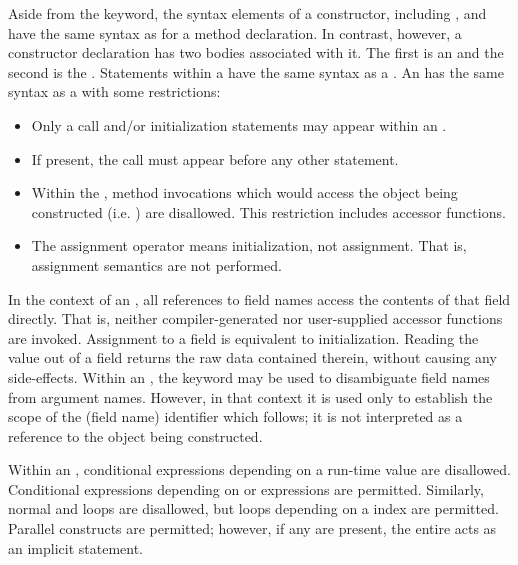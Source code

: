 Aside from the  keyword, the syntax elements of a constructor,
including ,  and 
have the same syntax as for a method declaration.  In contrast, however,
a constructor declaration has two bodies associated with it.  The first is
an  and the second is the .
Statements within a  have the same syntax as
a . An  has the same syntax as
a  with some restrictions:
\begin{itemize}
\item Only a  call and/or initialization statements
may appear within an .
\item If present, the  call must appear before any other statement.
\item Within the , method invocations which would
access the object being constructed (i.e. ) are disallowed.  This
restriction includes accessor functions.  
\item The assignment operator \chpl{=} means initialization, not assignment.
That is, assignment semantics are not performed.
\end{itemize}
\noindent
In the context of an
, all references to field names access the contents
of that field directly.  That is, neither compiler-generated nor user-supplied
accessor functions are invoked.  Assignment to a field is equivalent to
initialization.  Reading the value out of a field returns the raw data contained
therein, without causing any side-effects.  Within
an , the  keyword may be used to
disambiguate field names from argument names.  However, in that context it is used
only to establish the scope of the (field name) identifier which follows; it is
not interpreted as a reference to the object being constructed.

Within an , conditional expressions depending on a
run-time value are disallowed.  Conditional expressions depending
on  or  expressions are permitted.  Similarly,
normal  and  loops are disallowed, but loops depending on
a  index are permitted.  Parallel constructs are permitted; however,
if any are present, the entire  acts as an implicit
 statement.


